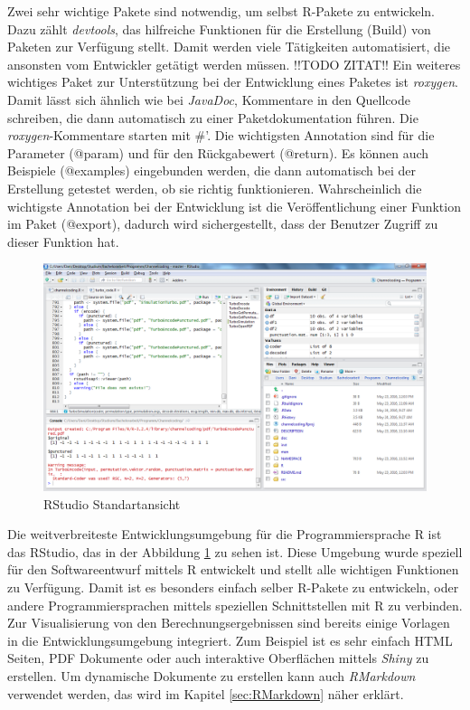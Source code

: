 Zwei sehr wichtige Pakete sind notwendig, um selbst R-Pakete zu entwickeln. Dazu zählt \emph{devtools}, das hilfreiche Funktionen für die Erstellung (Build) von Paketen zur Verfügung stellt. Damit werden viele Tätigkeiten automatisiert, die ansonsten vom Entwickler getätigt werden müssen. !!TODO ZITAT!!  Ein weiteres wichtiges Paket zur Unterstützung bei der Entwicklung eines Paketes ist \emph{roxygen}. Damit lässt sich ähnlich wie bei \emph{JavaDoc}, Kommentare in den Quellcode schreiben, die dann automatisch zu einer Paketdokumentation führen. Die \emph{roxygen}-Kommentare starten mit #'. Die wichtigsten Annotation sind für die Parameter (@param) und für den Rückgabewert (@return). Es können auch Beispiele (@examples) eingebunden werden, die dann automatisch bei der Erstellung getestet werden, ob sie richtig funktionieren. Wahrscheinlich die wichtigste Annotation bei der Entwicklung ist die Veröffentlichung einer Funktion im Paket (@export), dadurch wird sichergestellt, dass der Benutzer Zugriff zu dieser Funktion hat.

\begin{figure}[t]
\centering
\includegraphics[width=\ScaleIfNeeded]{pictures/RStudio}
\caption{RStudio Standartansicht}
\label{pic:RStudio}
\end{figure}

Die weitverbreiteste Entwicklungsumgebung für die Programmiersprache R ist das RStudio, das in der Abbildung \ref{pic:RStudio} zu sehen ist. Diese Umgebung wurde speziell für den Softwareentwurf mittels R entwickelt und stellt alle wichtigen Funktionen zu Verfügung. Damit ist es besonders einfach selber R-Pakete zu entwickeln, oder andere Programmiersprachen mittels speziellen Schnittstellen mit R zu verbinden. Zur Visualisierung von den Berechnungsergebnissen sind bereits einige Vorlagen in die Entwicklungsumgebung integriert. Zum Beispiel ist es sehr einfach HTML Seiten, PDF Dokumente oder auch interaktive Oberflächen mittels \emph{Shiny} zu erstellen. Um dynamische Dokumente zu erstellen kann auch \emph{RMarkdown} verwendet werden, das wird im Kapitel \ref{sec:RMarkdown} näher erklärt.

